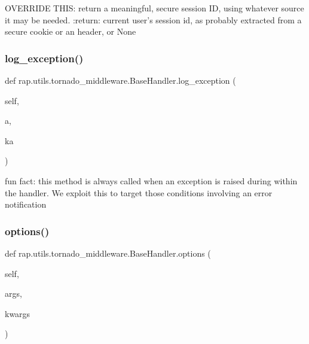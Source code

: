 \begin{DoxyVerb}OVERRIDE THIS: return a meaningful, secure session ID, using whatever source it may be needed.
:return: current user's session id, as probably extracted from a secure cookie or an header, or None
\end{DoxyVerb}
 \mbox{\label{classrap_1_1utils_1_1tornado__middleware_1_1BaseHandler_a4cc8a59625046421d72fc26ebdc48b8b}} 
\subsubsection{\texorpdfstring{log\+\_\+exception()}{log\_exception()}}
{\footnotesize\ttfamily def rap.\+utils.\+tornado\+\_\+middleware.\+Base\+Handler.\+log\+\_\+exception (\begin{DoxyParamCaption}\item[{}]{self,  }\item[{}]{a,  }\item[{}]{ka }\end{DoxyParamCaption})}

\begin{DoxyVerb}fun fact: this method is always called when an exception is raised during within the handler.
We exploit this to target those conditions involving an error notification\end{DoxyVerb}
 \mbox{\label{classrap_1_1utils_1_1tornado__middleware_1_1BaseHandler_a3dde4500ab26b4c0f085b0f0f87aeb00}} 
\subsubsection{\texorpdfstring{options()}{options()}}
{\footnotesize\ttfamily def rap.\+utils.\+tornado\+\_\+middleware.\+Base\+Handler.\+options (\begin{DoxyParamCaption}\item[{}]{self,  }\item[{}]{args,  }\item[{}]{kwargs }\end{DoxyParamCaption})}

